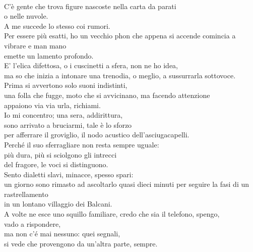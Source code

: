 
\cleardoublepage
{}
\thispagestyle{empty}

~

\vfill

\begin{flushright}
C’è gente che trova figure nascoste nella carta da parati \\
o nelle nuvole. \\
A me succede lo stesso coi rumori. \\
Per essere più esatti, ho un vecchio phon che appena si accende comincia a vibrare e man mano \\
emette un lamento profondo. \\
E’ l’elica difettosa, o i cuscinetti a sfera, non ne ho idea, \\
ma so che inizia a intonare una trenodia, o meglio, a sussurrarla sottovoce. \\
Prima si avvertono solo suoni indistinti, \\
una folla che fugge, moto che si avvicinano, ma facendo attenzione \\
appaiono via via urla, richiami. \\
Io mi concentro; una sera, addirittura, \\
sono arrivato a bruciarmi, tale è lo sforzo \\
per afferrare il groviglio, il nodo acustico dell’asciugacapelli. \\
Perché il suo sferragliare non resta sempre uguale: \\
più dura, più si sciolgono gli intrecci \\
del fragore, le voci si distinguono. \\
Sento dialetti slavi, minacce, spesso spari: \\
un giorno sono rimasto ad ascoltarlo quasi dieci minuti per seguire la fasi di un rastrellamento \\
in un lontano villaggio dei Balcani. \\
A volte ne esce uno squillo familiare, credo che sia il telefono, spengo, \\
vado a rispondere, \\
ma non c’é mai nessuno: quei segnali, \\
si vede che provengono da un’altra parte, sempre. \\

\end{flushright}
